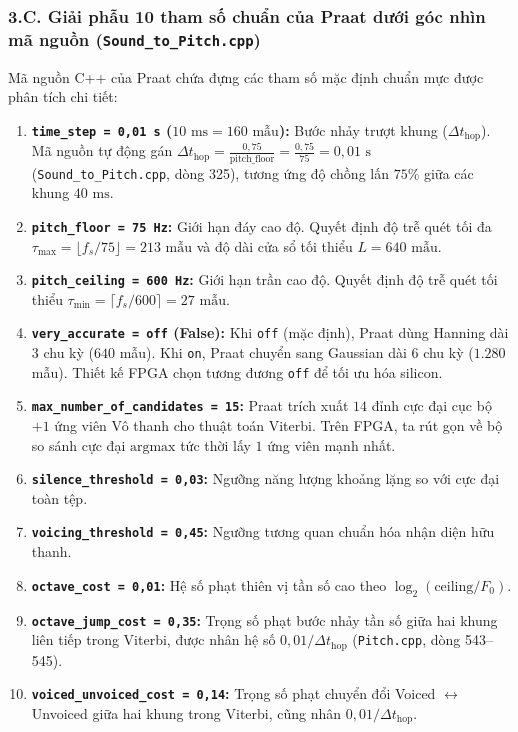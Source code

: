 \documentclass[11pt,a4paper]{article}
\begin{document}
\subsubsection*{3.C. Giải phẫu 10 tham số chuẩn của Praat dưới góc nhìn mã nguồn (\texttt{Sound\_to\_Pitch.cpp})}

Mã nguồn C++ của Praat chứa đựng các tham số mặc định chuẩn mực được phân tích chi tiết:
\begin{enumerate}
    \setlength{\itemsep}{1pt}
    \item \textbf{\texttt{time\_step = 0,01 s} ($10\text{ ms} = 160\text{ mẫu}$):} Bước nhảy trượt khung ($\Delta t_{\text{hop}}$). Mã nguồn tự động gán $\Delta t_{\text{hop}} = \frac{0{,}75}{\text{pitch\_floor}} = \frac{0{,}75}{75} = 0{,}01\text{ s}$ (\texttt{Sound\_to\_Pitch.cpp}, dòng 325), tương ứng độ chồng lấn $75\%$ giữa các khung $40\text{ ms}$.
    \item \textbf{\texttt{pitch\_floor = 75 Hz}:} Giới hạn đáy cao độ. Quyết định độ trễ quét tối đa $\tau_{\max} = \lfloor f_s / 75 \rfloor = 213\text{ mẫu}$ và độ dài cửa sổ tối thiểu $L = 640\text{ mẫu}$.
    \item \textbf{\texttt{pitch\_ceiling = 600 Hz}:} Giới hạn trần cao độ. Quyết định độ trễ quét tối thiểu $\tau_{\min} = \lceil f_s / 600 \rceil = 27\text{ mẫu}$.
    \item \textbf{\texttt{very\_accurate = off} (False):} Khi \texttt{off} (mặc định), Praat dùng Hanning dài 3 chu kỳ ($640$ mẫu). Khi \texttt{on}, Praat chuyển sang Gaussian dài 6 chu kỳ ($1.280$ mẫu). Thiết kế FPGA chọn tương đương \texttt{off} để tối ưu hóa silicon.
    \item \textbf{\texttt{max\_number\_of\_candidates = 15}:} Praat trích xuất $14$ đỉnh cực đại cục bộ $+ 1$ ứng viên Vô thanh cho thuật toán Viterbi. Trên FPGA, ta rút gọn về bộ so sánh cực đại $\text{argmax}$ tức thời lấy $1$ ứng viên mạnh nhất.
    \item \textbf{\texttt{silence\_threshold = 0,03}:} Ngưỡng năng lượng khoảng lặng so với cực đại toàn tệp.
    \item \textbf{\texttt{voicing\_threshold = 0,45}:} Ngưỡng tương quan chuẩn hóa nhận diện hữu thanh.
    \item \textbf{\texttt{octave\_cost = 0,01}:} Hệ số phạt thiên vị tần số cao theo $\log_2(\text{ceiling}/F_0)$.
    \item \textbf{\texttt{octave\_jump\_cost = 0,35}:} Trọng số phạt bước nhảy tần số giữa hai khung liên tiếp trong Viterbi, được nhân hệ số $0{,}01 / \Delta t_{\text{hop}}$ (\texttt{Pitch.cpp}, dòng 543--545).
    \item \textbf{\texttt{voiced\_unvoiced\_cost = 0,14}:} Trọng số phạt chuyển đổi Voiced $\leftrightarrow$ Unvoiced giữa hai khung trong Viterbi, cũng nhân $0{,}01 / \Delta t_{\text{hop}}$.
\end{enumerate}
\end{document}
